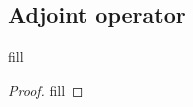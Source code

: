 \subsection{Adjoint operator}

\begin{exercise}{1}
fill
\end{exercise}
\begin{proof}
fill
\end{proof}